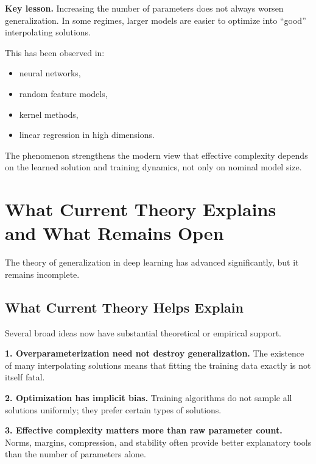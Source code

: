 \medskip

\noindent
\textbf{Key lesson.}
Increasing the number of parameters does not always worsen generalization. In some regimes, larger models are easier to optimize into ``good'' interpolating solutions.

\medskip

\noindent
This has been observed in:
\begin{itemize}
    \item neural networks,
    \item random feature models,
    \item kernel methods,
    \item linear regression in high dimensions.
\end{itemize}

\medskip

\noindent
The phenomenon strengthens the modern view that effective complexity depends on the learned solution and training dynamics, not only on nominal model size.

\section{What Current Theory Explains and What Remains Open}

The theory of generalization in deep learning has advanced significantly, but it remains incomplete.

\subsection{What Current Theory Helps Explain}

Several broad ideas now have substantial theoretical or empirical support.

\medskip

\noindent
\textbf{1. Overparameterization need not destroy generalization.}
The existence of many interpolating solutions means that fitting the training data exactly is not itself fatal.

\medskip

\noindent
\textbf{2. Optimization has implicit bias.}
Training algorithms do not sample all solutions uniformly; they prefer certain types of solutions.

\medskip

\noindent
\textbf{3. Effective complexity matters more than raw parameter count.}
Norms, margins, compression, and stability often provide better explanatory tools than the number of parameters alone.

